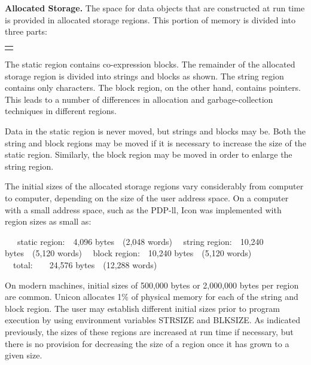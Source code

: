 \textbf{Allocated Storage. }The space for data objects that are
constructed at run time is provided in allocated storage regions. This
portion of memory is divided into three parts:

\begin{center}
\tabletail{}
\tablelasttail{}
\begin{supertabular}{|m{2.2858598in}|}
\hline
\centering{}\\\hline
\centering{}\\\hline
\end{supertabular}
\end{center}

The static region contains co-expression blocks. The remainder of the
allocated storage region is divided into strings and blocks as
shown. The string region contains only characters. The block region,
on the other hand, contains pointers. This leads to a number of
differences in allocation and garbage-collection techniques in
different regions.

Data in the static region is never moved, but strings and blocks may
be. Both the string and block regions may be moved if it is necessary
to increase the size of the static region. Similarly, the block region
may be moved in order to enlarge the string region.

The initial sizes of the allocated storage regions vary considerably
from computer to computer, depending on the size of the user address
space. On a computer with a small address space, such as the PDP-ll,
Icon was implemented with region sizes as small as:

\ \ \ static region:\ \ 4,096 bytes\ \ (2,048 words)\newline
\ \ string region:\ \ 10,240 bytes\ \ (5,120 words)\newline
\ \ block region:\ \ 10,240 bytes\ \ (5,120 words)\newline
\ \ total:\ \ \ \ 24,576 bytes\ \ (12,288 words)

On modern machines, initial sizes of 500,000 bytes or 2,000,000 bytes
per region are common. Unicon allocates 1\% of physical memory for
each of the string and block region. The user may establish different
initial sizes prior to program execution by using environment
variables STRSIZE and BLKSIZE. As indicated previously, the sizes of
these regions are increased at run time if necessary, but there is no
provision for decreasing the size of a region once it has grown to a
given size.

